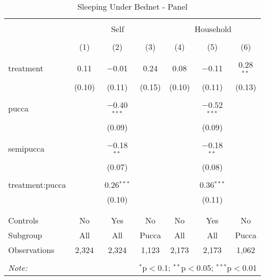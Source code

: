 
\begin{table}[!htbp] \centering 
  \caption{Sleeping Under Bednet - Panel} 
  \label{tbl:Sleeping Under Bednet - Panel} 
\begin{tabular}{@{\extracolsep{5pt}}lcccccc} 
\\[-1.8ex]\hline 
\hline \\[-1.8ex] 
 & \multicolumn{3}{c}{Self} & \multicolumn{3}{c}{Household} \\ 
\\[-1.8ex] & (1) & (2) & (3) & (4) & (5) & (6)\\ 
\hline \\[-1.8ex] 
 treatment & 0.11 & $-$0.01 & 0.24 & 0.08 & $-$0.11 & 0.28$^{**}$ \\ 
  & (0.10) & (0.11) & (0.15) & (0.10) & (0.11) & (0.13) \\ 
  & & & & & & \\ 
 pucca &  & $-$0.40$^{***}$ &  &  & $-$0.52$^{***}$ &  \\ 
  &  & (0.09) &  &  & (0.09) &  \\ 
  & & & & & & \\ 
 semipucca &  & $-$0.18$^{**}$ &  &  & $-$0.18$^{**}$ &  \\ 
  &  & (0.07) &  &  & (0.08) &  \\ 
  & & & & & & \\ 
 treatment:pucca &  & 0.26$^{***}$ &  &  & 0.36$^{***}$ &  \\ 
  &  & (0.10) &  &  & (0.11) &  \\ 
  & & & & & & \\ 
\hline \\[-1.8ex] 
Controls & No & Yes & No & No & Yes & No \\ 
Subgroup & All & All & Pucca & All & All & Pucca \\ 
Observations & 2,324 & 2,324 & 1,123 & 2,173 & 2,173 & 1,062 \\ 
\hline 
\hline \\[-1.8ex] 
\textit{Note:}  & \multicolumn{6}{r}{$^{*}$p$<$0.1; $^{**}$p$<$0.05; $^{***}$p$<$0.01} \\ 
\end{tabular} 
\end{table} 
